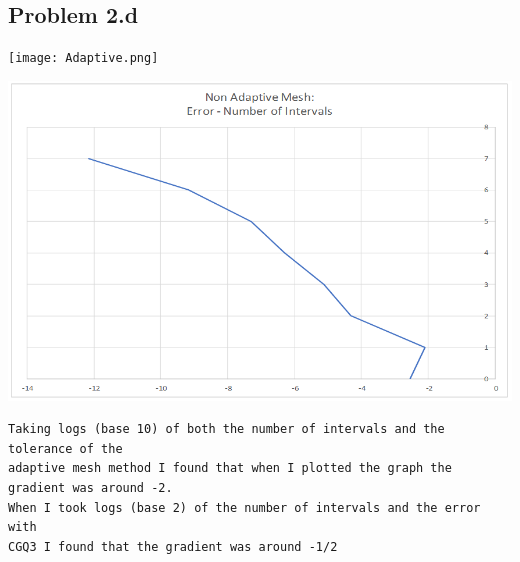 \documentclass[a4paper,12pt,onecolumn,final]{article}
\begin{document}
\subsection*{Problem 2.d}

\texttt{[image: Adaptive.png]} 

\includegraphics[scale=1]{NonAdaptive.png} 

\begin{verbatim}
Taking logs (base 10) of both the number of intervals and the tolerance of the 
adaptive mesh method I found that when I plotted the graph the gradient was around -2. 
When I took logs (base 2) of the number of intervals and the error with 
CGQ3 I found that the gradient was around -1/2

\end{verbatim}



\end{document}
